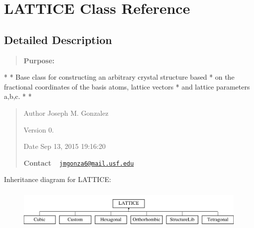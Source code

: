 \hypertarget{class_l_a_t_t_i_c_e}{}\section{L\+A\+T\+T\+I\+C\+E Class Reference}
\label{class_l_a_t_t_i_c_e}


\subsection{Detailed Description}
\begin{quote}


{\bfseries Purpose\+:} 

\end{quote}
\begin{DoxyVerb}*
*  Base class for constructing an arbitrary crystal structure based 
*  on the fractional coordinates of the basis atoms, lattice vectors
*  and lattice parameters a,b,c.
*
* \end{DoxyVerb}
 \begin{quote}
\begin{DoxyAuthor}{Author}
Joseph M. Gonzalez
\end{DoxyAuthor}
\begin{DoxyVersion}{Version}
0.
\end{DoxyVersion}
\begin{DoxyDate}{Date}
Sep 13, 2015 19\+:16\+:20
\end{DoxyDate}
{\bfseries Contact} ~\newline
 \href{mailto:jmgonza6@mail.usf.edu}{\tt jmgonza6@mail.\+usf.\+edu}\end{quote}
Inheritance diagram for L\+A\+T\+T\+I\+C\+E\+:\begin{figure}[H]
\begin{center}
\leavevmode
\includegraphics[height=1.924399cm]{class_l_a_t_t_i_c_e}
\end{center}
\end{figure}
